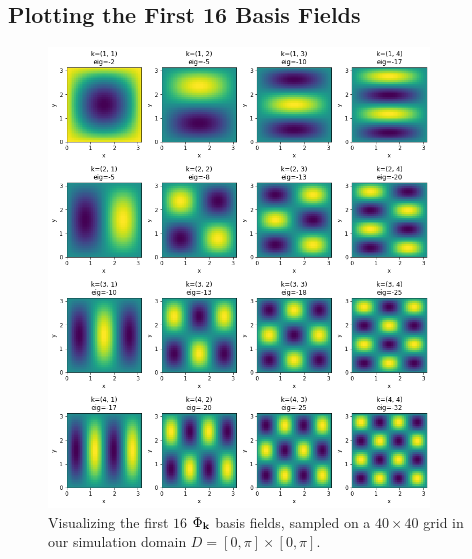 \appendix
\chapter*{\fuggelek}
\setcounter{chapter}{\appendixnumber}

\section{Plotting the First 16 Basis Fields}

\begin{figure}[!htb]
  \centering
    \includegraphics[width=0.9\textwidth]{figures/eigenfluids/16_basis_fields.png}
    \caption{Visualizing the first $16$ $\Phi_{\vb{k}}$ basis fields, sampled on
    a $40 \times 40$ grid in our simulation domain $D = [0,\pi] \times
  [0,\pi]$.}
  \label{appendix:first_16}
\end{figure}
